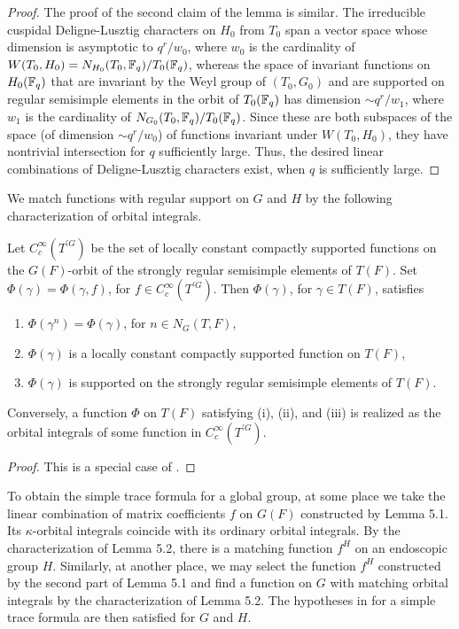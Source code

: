 \documentclass{amsart}
\newenvironment{cthm}[1]
  {\renewcommand\thethm{\sc #1}\thm}
  {\endthm}
\newcommand\Fq{{\Bbb F}_q}
\begin{document}
\begin{proof}
The proof of the second claim of the lemma is similar.  The
irreducible cuspidal Deligne-Lusztig
characters on $H_0$ from $T_0$ span a vector space whose dimension
is
asymptotic to $q^r/w_0$, where $w_0$ is the cardinality of
$W(T_0,H_0)=N_{H_0}(T_0,\Fq)/T_0(\Fq)$, whereas the 
space of invariant functions on $H_0(\Fq)$
that are invariant by the Weyl group of $(T_0,G_0)$ and are
supported on regular semisimple elements in the orbit of $T_0(\Fq)$
has dimension
$\sim q^r/w_1$, where $w_1$ is the
cardinality of $N_{G_0}(T_0,\Fq)/T_0(\Fq)$.  
Since these are both subspaces of the space (of dimension 
$\sim q^r/w_0$) of functions invariant under $W(T_0,H_0)$, they
have nontrivial intersection for $q$ sufficiently large.
Thus, the desired
linear combinations of Deligne-Lusztig characters exist, when
$q$ is sufficiently large.\end{proof}

We match functions with regular support on $G$ and $H$ by
the following characterization of orbital integrals.

\begin{cthm}{Lemma 5.2}  Let $C_c^\infty(T^{'G})$ be the set of locally
constant
compactly supported functions on the $G(F)$-orbit of the
strongly regular semisimple elements of $T(F)$.  Set
$\Phi(\gamma) = \Phi(\gamma,f)$, for $f\in C_c^\infty(T^{'G})$.
Then $\Phi(\gamma)$, for $\gamma\in T(F)$,  satisfies
\begin{enumerate}[label=(\roman*)]
\item  $\Phi(\gamma^n) = \Phi(\gamma)$, for $n\in N_G(T,F)$,

\item $\Phi(\gamma)$ is a locally constant compactly supported
	function on $T(F)$,

\item $\Phi(\gamma)$ is supported on the strongly regular semisimple
	elements of $T(F)$.
\end{enumerate}
Conversely, a function $\Phi$ on $T(F)$
satisfying (i), (ii), and (iii) is realized
as the
orbital integrals of some function in $C_c^\infty(T^{'G})$.
\end{cthm}

\begin{proof}  This is a special case of \cite{Vi}.\end{proof}

\bigskip
To obtain the simple trace formula for a global group, at some place
we take the
linear combination of matrix coefficients
$f$ on $G(F)$ constructed by Lemma 5.1.  Its $\kappa$-orbital
integrals coincide with its ordinary orbital integrals.
By the characterization of Lemma 5.2, 
there is a matching function $f^H$ on an
endoscopic group $H$.  Similarly, at another place, we may
select the function $f^H$ constructed by the second part of
Lemma 5.1 and find a function on $G$ with matching orbital
integrals by the characterization of Lemma 5.2. 
The hypotheses in \cite{He} for a simple trace formula
are then satisfied for $G$ and $H$.
\end{document}
